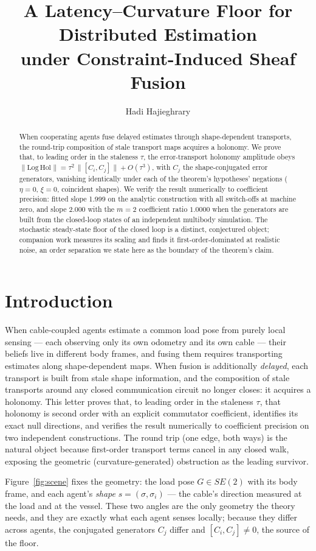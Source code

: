 \documentclass[letterpaper, 10pt, journal]{IEEEtran}
\title{A Latency--Curvature Floor for Distributed Estimation\\
under Constraint-Induced Sheaf Fusion}
\author{Hadi Hajieghrary}
\begin{document}
\maketitle

\begin{abstract}
When cooperating agents fuse delayed estimates through shape-dependent
transports, the round-trip composition of stale transport maps acquires a
holonomy. We prove that, to leading order in the staleness $\tau$, the
error-transport holonomy amplitude obeys $\|\mathrm{Log\,Hol}\| =
\tau^2\,\|[C_i,C_j]\| + O(\tau^3)$, with $C_j$ the shape-conjugated error
generators, vanishing identically under each of the theorem's hypotheses'
negations ($\eta=0$, $\xi=0$, coincident shapes). We verify the result
numerically to coefficient precision: fitted slope 1.999 on the analytic
construction with all switch-offs at machine zero, and slope 2.000 with the
$m{=}2$ coefficient ratio $1.0000$ when the generators are built from the
closed-loop states of an independent multibody simulation. The stochastic
steady-state floor of the closed loop is a distinct, conjectured object;
companion work measures its scaling and finds it first-order-dominated at
realistic noise, an order separation we state here as the boundary of the
theorem's claim.
\end{abstract}

\section{Introduction}
When cable-coupled agents estimate a common load pose from purely local
sensing --- each observing only its own odometry and its own cable --- their
beliefs live in different body frames, and fusing them requires transporting
estimates along shape-dependent maps. When fusion is additionally
\emph{delayed}, each transport is built from stale shape information, and the
composition of stale transports around any closed communication circuit no
longer closes: it acquires a holonomy. This letter proves that, to leading
order in the staleness $\tau$, that holonomy is second order with an explicit
commutator coefficient, identifies its exact null directions, and verifies the
result numerically to coefficient precision on two independent constructions.
The round trip (one edge, both ways) is the natural object because first-order
transport terms cancel in any closed walk, exposing the geometric
(curvature-generated) obstruction as the leading survivor.

Figure~\ref{fig:scene} fixes the geometry: the load pose $G \in SE(2)$ with
its body frame, and each agent's \emph{shape} $s = (\sigma, \sigma_i)$ --- the
cable's direction measured at the load and at the vessel. These two angles are
the only geometry the theory needs, and they are exactly what each agent senses
locally; because they differ across agents, the conjugated generators $C_j$
differ and $[C_i,C_j]\neq0$, the source of the floor.
\end{document}
